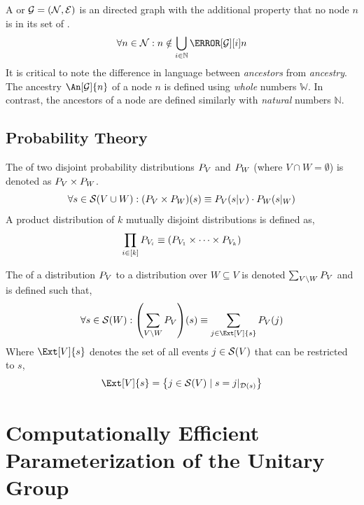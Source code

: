 \documentclass[aps, 10pt, english, twoside, pra, nofootinbib, tightenlines, longbibliography]{revtex4-1}
\renewcommand{\Events}[1]{\mathcal{S}\br{#1}} %
\begin{document}
    \begin{definition}
        \label{def:dag}
        A  or  $\graph = \br{\nodes, \edges}$ is an directed graph with the additional property that no node $n$ is in its set of .
        \[ \forall n \in \nodes : n \notin \bigcup_{i\in\mathbb{N}} \Pa[\graph][i]{n}\]
        It is critical to note the difference in language between \textit{ancestors} from \textit{ancestry}. The ancestry $\An[\graph]{n}$ of a node $n$ is defined using \textit{whole} numbers $\mathbb{W}$. In contrast, the ancestors of a node are defined similarly with \textit{natural} numbers $\mathbb{N}$.
    \end{definition}

    \subsection{Probability Theory}
    \label{sec:probability_theory}

    \begin{definition}
        The  of two disjoint probability distributions $\prob[V]$ and $\prob[W]$ (where $V \cap W = \emptyset$) is denoted as $\prob[V] \times \prob[W]$.
        \[ \forall s \in \Events{V \cup W} : \br{\prob[V] \times \prob[W]}\br{s} \defined \prob[V][s|_{V}]\cdot\prob[W][s|_{W}] \]
        A product distribution of $k$ mutually disjoint distributions is defined as,
        \[ \prod_{i\in\bs{k}} \prob[V_i] \defined \br{\prob[V_1] \times \cdots \times \prob[V_k]} \]
    \end{definition}

    \begin{definition}
        The  of a distribution $\prob[V]$ to a distribution over $W \subseteq V$ is denoted $\sum_{V \setminus W} \prob[V]$ and is defined such that,
        \[ \forall s \in \Events{W} : \br{\sum_{V \setminus W} \prob[V]}\br{s} \defined \sum_{j \in \Ext[V]{s}} \prob[V][j] \]
        Where $\Ext[V]{s}$ denotes the set of all events $j \in \Events{V}$ that can be restricted to $s$,
        \[ \Ext[V]{s} = \bc{j \in \Events{V} \mid s = j|_{\s{D}\br{s}}} \]
    \end{definition}

    \section{Computationally Efficient Parameterization of the Unitary Group}
    \label{sec:comp_spengler}
\end{document}
